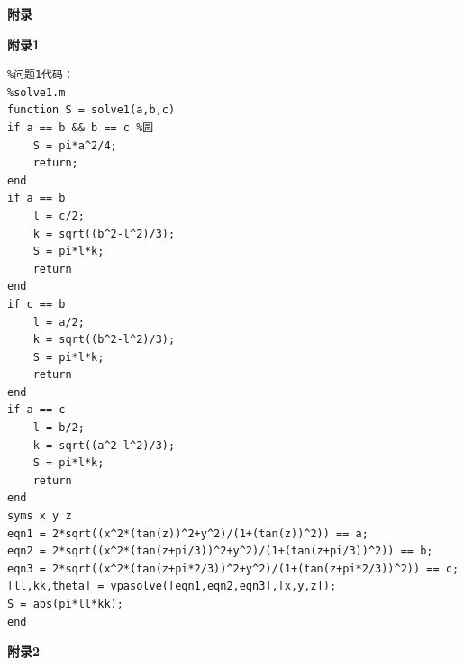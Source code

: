 \documentclass[a4paper,10.5pt]{ctexart}
\begin{document}
\begin{center}
\Large{\bf {附\qquad 录}}

\end{center}
{\bf 附录1}
\begin{lstlisting}
%问题1代码：
%solve1.m
function S = solve1(a,b,c)
if a == b && b == c %圆
    S = pi*a^2/4;
    return;
end
if a == b 
    l = c/2;
    k = sqrt((b^2-l^2)/3);
    S = pi*l*k;
    return
end
if c == b 
    l = a/2;
    k = sqrt((b^2-l^2)/3);
    S = pi*l*k;
    return
end
if a == c
    l = b/2;
    k = sqrt((a^2-l^2)/3);
    S = pi*l*k;
    return
end
syms x y z
eqn1 = 2*sqrt((x^2*(tan(z))^2+y^2)/(1+(tan(z))^2)) == a;
eqn2 = 2*sqrt((x^2*(tan(z+pi/3))^2+y^2)/(1+(tan(z+pi/3))^2)) == b;
eqn3 = 2*sqrt((x^2*(tan(z+pi*2/3))^2+y^2)/(1+(tan(z+pi*2/3))^2)) == c;
[ll,kk,theta] = vpasolve([eqn1,eqn2,eqn3],[x,y,z]);
S = abs(pi*ll*kk);
end
\end{lstlisting}
{\bf 附录2}
\end{document}
